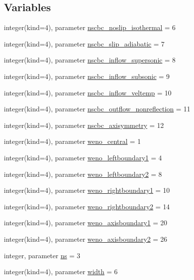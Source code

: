 \subsection*{Variables}
\begin{DoxyCompactItemize}
\item 
integer(kind=4), parameter \hyperlink{namespacenavierstokesrhsweno_acc03638c1b5de1b5efb5bf82d44bab60}{nscbc\+\_\+noslip\+\_\+isothermal} = 6
\item 
integer(kind=4), parameter \hyperlink{namespacenavierstokesrhsweno_a61b688d5e56fecdb26047d0427b4180d}{nscbc\+\_\+slip\+\_\+adiabatic} = 7
\item 
integer(kind=4), parameter \hyperlink{namespacenavierstokesrhsweno_a38d8dd65816be04f23b62b1a44902ad2}{nscbc\+\_\+inflow\+\_\+supersonic} = 8
\item 
integer(kind=4), parameter \hyperlink{namespacenavierstokesrhsweno_a107aa9ceb3e9d2a5a94105422ed2ba17}{nscbc\+\_\+inflow\+\_\+subsonic} = 9
\item 
integer(kind=4), parameter \hyperlink{namespacenavierstokesrhsweno_a5be437968972476e91d15252df952b44}{nscbc\+\_\+inflow\+\_\+veltemp} = 10
\item 
integer(kind=4), parameter \hyperlink{namespacenavierstokesrhsweno_a44d1aa8c46aa6d879e759954abdbb1f6}{nscbc\+\_\+outflow\+\_\+nonreflection} = 11
\item 
integer(kind=4), parameter \hyperlink{namespacenavierstokesrhsweno_a5d52dfb26d090fc1dd8555dbd4b41ea1}{nscbc\+\_\+axisymmetry} = 12
\item 
integer(kind=4), parameter \hyperlink{namespacenavierstokesrhsweno_af011f25d6b892365a71782a1acc53cac}{weno\+\_\+central} = 1
\item 
integer(kind=4), parameter \hyperlink{namespacenavierstokesrhsweno_aaea0ea1a649fc6e1c76d7e09afd83e17}{weno\+\_\+leftboundary1} = 4
\item 
integer(kind=4), parameter \hyperlink{namespacenavierstokesrhsweno_abc7c2a47f826df42ffb4de7f3c3b9e0b}{weno\+\_\+leftboundary2} = 8
\item 
integer(kind=4), parameter \hyperlink{namespacenavierstokesrhsweno_a5f3396ae1256ba3e5cbf718cbf261618}{weno\+\_\+rightboundary1} = 10
\item 
integer(kind=4), parameter \hyperlink{namespacenavierstokesrhsweno_aedc66bac095d9c04f800491a6a77de56}{weno\+\_\+rightboundary2} = 14
\item 
integer(kind=4), parameter \hyperlink{namespacenavierstokesrhsweno_af94f674d95f5f5ef6262da407a7fd4c8}{weno\+\_\+axisboundary1} = 20
\item 
integer(kind=4), parameter \hyperlink{namespacenavierstokesrhsweno_a903f5f21fcefb6a5062f328e7a8b8164}{weno\+\_\+axisboundary2} = 26
\item 
integer, parameter \hyperlink{namespacenavierstokesrhsweno_a24a7b443382b45612203c265466399d4}{ns} = 3
\item 
integer(kind=4), parameter \hyperlink{namespacenavierstokesrhsweno_af00ac01da0553acc8e7382cfc4a5ca1b}{width} = 6
\end{DoxyCompactItemize}
